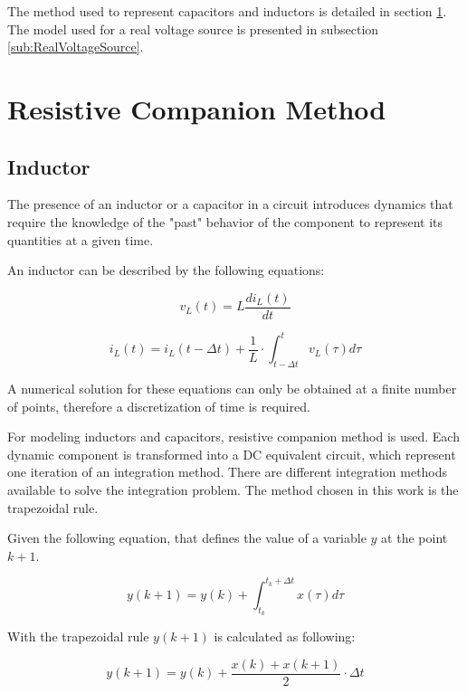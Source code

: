 The method used to represent capacitors and inductors is detailed in section \ref{ResistiveCompanion}. The model used for a real voltage source is presented in subsection \ref{sub:RealVoltageSource}.

 
\section{Resistive Companion Method} \label{ResistiveCompanion}

\subsection{Inductor} \label{ResistiveCompanionInductor}
The presence of an inductor or a capacitor in a circuit introduces dynamics that require the knowledge of the "past" behavior of the component to represent its quantities at a given time.

An inductor can be described by the following equations: 

\begin{equation}
        v_L(t) = L \frac{di_L(t)}{dt}
\end{equation}

\begin{equation}
        i_L(t) = i_L(t- \Delta t) + \frac{1}{L} \cdot \int_{t- \Delta t}^{t} v_L(\tau) d \tau 
\end{equation}

A numerical solution for these equations can only be obtained at a finite number of points, therefore a discretization of time is required.

For modeling inductors and capacitors, resistive companion method is used. Each dynamic component is transformed into a DC equivalent circuit, which represent one iteration of an integration method.
There are different integration methods available to solve the integration problem. The method chosen in this work is the trapezoidal rule.

Given the following equation, that defines the value of a variable $y$ at the point $k+1$.

\begin{equation}
	y(k+1) = y(k) + \int_{t_k}^{t_k+ \Delta t} x(\tau)d \tau
\end{equation}

With the trapezoidal rule $y(k+1)$ is calculated as following:

\begin{equation}
	y(k+1)=y(k)+ \frac{x(k)+x(k+1)}{2} \cdot \Delta t
\end{equation}


